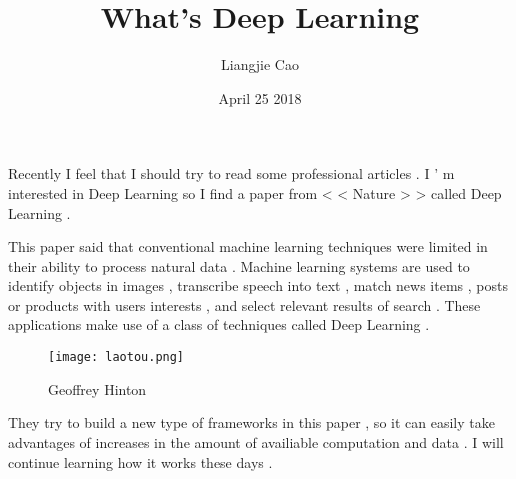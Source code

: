 \documentclass[50pt]{article}
\begin{document}
\title{What's Deep Learning}
\author{Liangjie Cao}
\date{April 25 2018}
\maketitle
\par
Recently I feel that I should try to read some professional articles . I ' m interested in Deep Learning so I find a paper from < < Nature > > called Deep Learning . \\
\par
This paper said that conventional machine learning techniques were limited in their ability to process natural data . Machine learning systems are used to identify objects in images , transcribe speech into text , match news items , posts or products with users interests , and select relevant results of search . \cite{name1} These applications make use of a class of techniques called Deep Learning .  \\
 \begin{figure}[ht]
 \centering
 \texttt{[image: laotou.png]}\\
 \caption{Geoffrey Hinton}
\end{figure}
\par
They try to build a new type of frameworks in this paper , so it can easily take advantages of increases in the amount of availiable computation and data . I will continue learning how it works these days . \\
%

\end{document}
